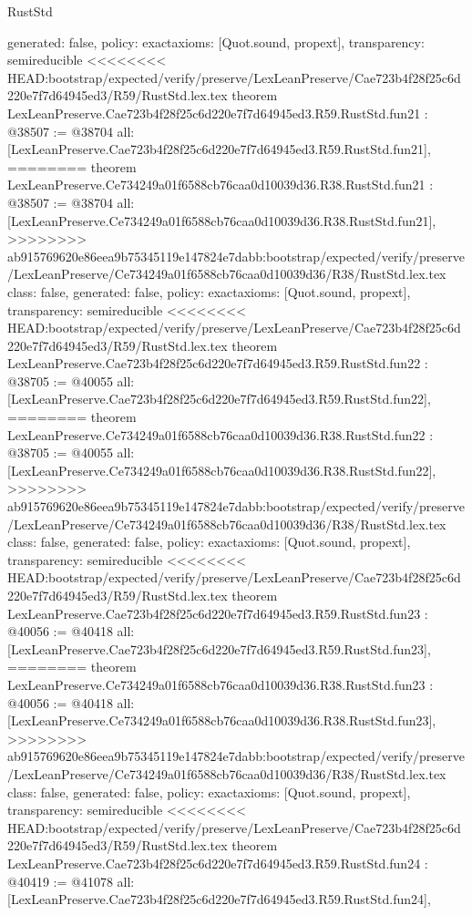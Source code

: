 \begin{lexlean}{RustStd}
\begin{coremodule}
{\begin{coremodule}
{{{{{{{{{{{{{{{{{{{{{{{{  generated: false,
  policy: exact{axioms: [Quot.sound, propext]},
  transparency: semireducible
}
<<<<<<<< HEAD:bootstrap/expected/verify/preserve/LexLeanPreserve/Cae723b4f28f25c6d220e7f7d64945ed3/R59/RustStd.lex.tex
theorem LexLeanPreserve.Cae723b4f28f25c6d220e7f7d64945ed3.R59.RustStd.fun21 : @38507 := @38704 {
  all: [LexLeanPreserve.Cae723b4f28f25c6d220e7f7d64945ed3.R59.RustStd.fun21],
========
theorem LexLeanPreserve.Ce734249a01f6588cb76caa0d10039d36.R38.RustStd.fun21 : @38507 := @38704 {
  all: [LexLeanPreserve.Ce734249a01f6588cb76caa0d10039d36.R38.RustStd.fun21],
>>>>>>>> ab915769620e86eea9b75345119e147824e7dabb:bootstrap/expected/verify/preserve/LexLeanPreserve/Ce734249a01f6588cb76caa0d10039d36/R38/RustStd.lex.tex
  class: false,
  generated: false,
  policy: exact{axioms: [Quot.sound, propext]},
  transparency: semireducible
}
<<<<<<<< HEAD:bootstrap/expected/verify/preserve/LexLeanPreserve/Cae723b4f28f25c6d220e7f7d64945ed3/R59/RustStd.lex.tex
theorem LexLeanPreserve.Cae723b4f28f25c6d220e7f7d64945ed3.R59.RustStd.fun22 : @38705 := @40055 {
  all: [LexLeanPreserve.Cae723b4f28f25c6d220e7f7d64945ed3.R59.RustStd.fun22],
========
theorem LexLeanPreserve.Ce734249a01f6588cb76caa0d10039d36.R38.RustStd.fun22 : @38705 := @40055 {
  all: [LexLeanPreserve.Ce734249a01f6588cb76caa0d10039d36.R38.RustStd.fun22],
>>>>>>>> ab915769620e86eea9b75345119e147824e7dabb:bootstrap/expected/verify/preserve/LexLeanPreserve/Ce734249a01f6588cb76caa0d10039d36/R38/RustStd.lex.tex
  class: false,
  generated: false,
  policy: exact{axioms: [Quot.sound, propext]},
  transparency: semireducible
}
<<<<<<<< HEAD:bootstrap/expected/verify/preserve/LexLeanPreserve/Cae723b4f28f25c6d220e7f7d64945ed3/R59/RustStd.lex.tex
theorem LexLeanPreserve.Cae723b4f28f25c6d220e7f7d64945ed3.R59.RustStd.fun23 : @40056 := @40418 {
  all: [LexLeanPreserve.Cae723b4f28f25c6d220e7f7d64945ed3.R59.RustStd.fun23],
========
theorem LexLeanPreserve.Ce734249a01f6588cb76caa0d10039d36.R38.RustStd.fun23 : @40056 := @40418 {
  all: [LexLeanPreserve.Ce734249a01f6588cb76caa0d10039d36.R38.RustStd.fun23],
>>>>>>>> ab915769620e86eea9b75345119e147824e7dabb:bootstrap/expected/verify/preserve/LexLeanPreserve/Ce734249a01f6588cb76caa0d10039d36/R38/RustStd.lex.tex
  class: false,
  generated: false,
  policy: exact{axioms: [Quot.sound, propext]},
  transparency: semireducible
}
<<<<<<<< HEAD:bootstrap/expected/verify/preserve/LexLeanPreserve/Cae723b4f28f25c6d220e7f7d64945ed3/R59/RustStd.lex.tex
theorem LexLeanPreserve.Cae723b4f28f25c6d220e7f7d64945ed3.R59.RustStd.fun24 : @40419 := @41078 {
  all: [LexLeanPreserve.Cae723b4f28f25c6d220e7f7d64945ed3.R59.RustStd.fun24],
}}}}}}}}}}}}}}}}}}}}}}}}}}}
\end{coremodule}}
\end{coremodule}
\end{lexlean}

